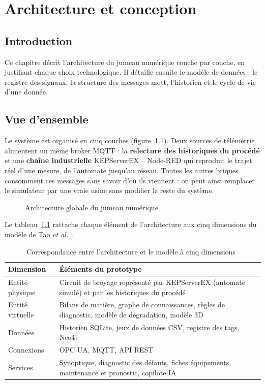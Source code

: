 \chapter{Architecture et conception}
\label{chap:architecture}

\section{Introduction}
Ce chapitre décrit l'architecture du jumeau numérique couche par couche, en justifiant chaque choix technologique. Il détaille ensuite le modèle de données : le registre des signaux, la structure des messages \gls{mqtt}, l'historien et le cycle de vie d'une donnée.

\section{Vue d'ensemble}
Le système est organisé en cinq couches (figure~\ref{fig:archi}). Deux sources de télémétrie alimentent un même broker MQTT : la \textbf{relecture des historiques du procédé} et une \textbf{chaîne industrielle} KEPServerEX -- Node-RED qui reproduit le trajet réel d'une mesure, de l'automate jusqu'au réseau. Toutes les autres briques consomment ces messages sans savoir d'où ils viennent : on peut ainsi remplacer le simulateur par une vraie usine sans modifier le reste du système.

\begin{figure}[H]
\centering
\resizebox{\textwidth}{!}{}
\caption{Architecture globale du jumeau numérique}
\label{fig:archi}
\end{figure}

Le tableau~\ref{tab:5d} rattache chaque élément de l'architecture aux cinq dimensions du modèle de Tao \textit{et al.}~\cite{tao2018}.

\begin{table}[H]
\centering
\caption{Correspondance entre l'architecture et le modèle à cinq dimensions~\cite{tao2018}}
\label{tab:5d}
\begin{tabularx}{\textwidth}{lX}
\toprule
\textbf{Dimension} & \textbf{Éléments du prototype} \\
\midrule
Entité physique & Circuit de broyage représenté par KEPServerEX (automate simulé) et par les historiques du procédé \\
Entité virtuelle & Bilans de matière, graphe de connaissances, règles de diagnostic, modèle de dégradation, modèle 3D \\
Données & Historien SQLite, jeux de données CSV, registre des tags, Neo4j \\
Connexions & OPC UA, MQTT, API REST \\
Services & Synoptique, diagnostic des défauts, fiches équipements, maintenance et pronostic, copilote IA \\
\bottomrule
\end{tabularx}
\end{table}


